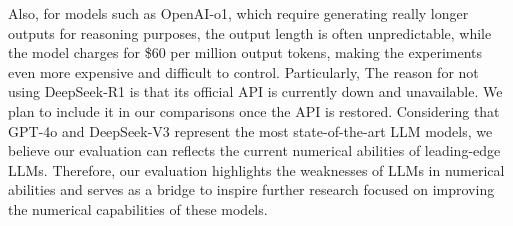 Also, for models such as OpenAI-o1, 
which require generating really longer outputs for reasoning purposes, the output length is often unpredictable, while the model charges for \$60 per million output tokens, making the experiments even more expensive and difficult to control.
Particularly,
The reason for not using DeepSeek-R1 is that its official API is currently down and unavailable. We plan to include it in our comparisons once the API is restored.
Considering that GPT-4o and DeepSeek-V3 represent  the most state-of-the-art LLM models, we believe our evaluation can reflects the current numerical abilities of leading-edge LLMs.
Therefore, our evaluation highlights the weaknesses of LLMs in numerical abilities and serves as a bridge to inspire further research focused on improving the numerical capabilities of these models.




 